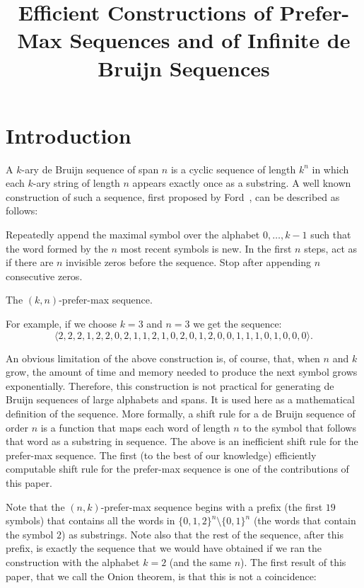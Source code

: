 \documentclass{article} %
\title{Efficient Constructions of Prefer-Max Sequences and of Infinite de Bruijn
	Sequences}
\author{}
\theoremstyle{definition} \newtheorem{definition}[theorem]{Definition}
\begin{document}
 \maketitle
	
	\section{Introduction}
	
	A $k$-ary de Bruijn sequence of span $n$ is a cyclic sequence of length $k^n$
	in which each $k$-ary string of length $n$ appears exactly once as a substring.
	A well known construction of such a sequence, first proposed by
	Ford~\cite{Ford1957}, can be described as follows:
	
	\begin{algorithm}
		Repeatedly append the maximal symbol over the alphabet
		$0,\dots,k-1$ such that the word formed by the $n$ most recent symbols is new.
		In the first $n$ steps, act as if there are $n$ invisible zeros before the
		sequence. Stop after appending $n$ consecutive zeros. 
		\caption{The $(k,n)$-prefer-max sequence.} 
		\label{pref-max} 
	\end{algorithm}
	
	
	For example, if we choose $k=3$ and $n=3$ we get the sequence:
	$$\langle2,2,2,1,2,2,0,2,1,1,2,1,0,2,0,1,2,0,0,1,1,1,0,1,0,0,0\rangle.$$
	
	
	An obvious limitation of the above construction is, of course, that, when $n$
	and $k$ grow, the amount of time and memory needed to produce the next symbol
	grows exponentially. Therefore, this construction is not practical for
	generating de Bruijn sequences of large alphabets and spans. It is used here as
	a mathematical definition of the sequence. More formally, a shift rule for a de
	Bruijn sequence of order $n$ is a function that maps each word of length $n$ to
	the symbol that follows that word as a substring in sequence. The above is an
	inefficient shift rule for the prefer-max sequence. The first (to the best of
	our knowledge) efficiently computable shift rule for the prefer-max sequence is
	one of the contributions of this paper.
	
	Note that the $(n,k)$-prefer-max sequence begins with a prefix (the first $19$
	symbols) that contains all the words in $\{0,1,2\}^n \setminus \{0,1\}^n$  (the
	words that contain the symbol $2$) as substrings. Note also that the rest of
	the sequence, after this prefix, is exactly the sequence that we would have
	obtained if we ran the construction with the alphabet $k=2$ (and the same $n$).
	The first result of this paper, that we call the Onion theorem, is that this is
	not a coincidence:
	
\end{document}
